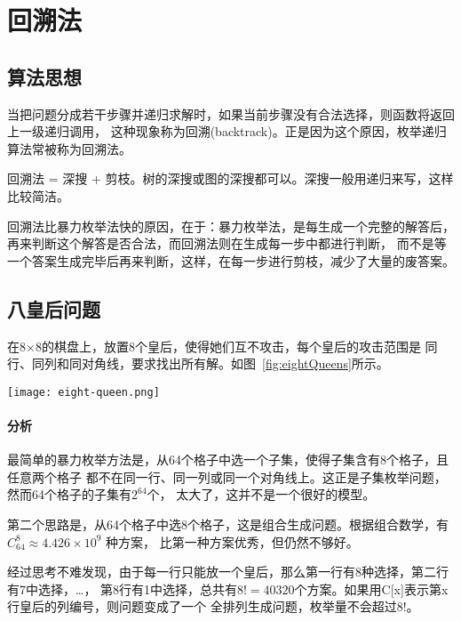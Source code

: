 \chapter{回溯法}

\section{算法思想} %

当把问题分成若干步骤并递归求解时，如果当前步骤没有合法选择，则函数将返回上一级递归调用，
这种现象称为回溯(backtrack)。正是因为这个原因，枚举递归算法常被称为回溯法。

回溯法 = 深搜 + 剪枝。树的深搜或图的深搜都可以。深搜一般用递归来写，这样比较简洁。

回溯法比暴力枚举法快的原因，在于：暴力枚举法，是每生成一个完整的解答后，
再来判断这个解答是否合法，而回溯法则在生成每一步中都进行判断，
而不是等一个答案生成完毕后再来判断，这样，在每一步进行剪枝，减少了大量的废答案。

\section{八皇后问题} %

在8×8的棋盘上，放置8个皇后，使得她们互不攻击，每个皇后的攻击范围是
同行、同列和同对角线，要求找出所有解。如图~\ref{fig:eightQueens}所示。

\begin{center}
\texttt{[image: eight-queen.png]} \\
\label{fig:eightQueens}
\end{center}

\subsubsection{分析}
最简单的暴力枚举方法是，从64个格子中选一个子集，使得子集含有8个格子，且任意两个格子
都不在同一行、同一列或同一个对角线上。这正是子集枚举问题，然而64个格子的子集有$2^64$个，
太大了，这并不是一个很好的模型。

第二个思路是，从64个格子中选8个格子，这是组合生成问题。根据组合数学，有 $C_{64}^{8} \approx 4.426 \times 10^9$ 种方案，
比第一种方案优秀，但仍然不够好。

经过思考不难发现，由于每一行只能放一个皇后，那么第一行有8种选择，第二行有7中选择，…，
第8行有1中选择，总共有$8!=40320$个方案。如果用C[x]表示第x行皇后的列编号，则问题变成了一个
全排列生成问题，枚举量不会超过8!。


